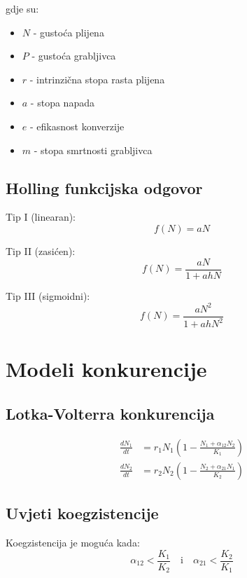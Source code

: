 \documentclass[12pt,a4paper,twoside]{book}
\begin{document}
	gdje su:
	\begin{itemize}
		\item $N$ - gustoća plijena
		\item $P$ - gustoća grabljivca
		\item $r$ - intrinzična stopa rasta plijena
		\item $a$ - stopa napada
		\item $e$ - efikasnost konverzije
		\item $m$ - stopa smrtnosti grabljivca
	\end{itemize}
	
	\subsection{Holling funkcijska odgovor}
	Tip I (linearan):
	\begin{equation}
		f(N) = aN
	\end{equation}
	
	Tip II (zasićen):
	\begin{equation}
		f(N) = \frac{aN}{1 + ahN}
	\end{equation}
	
	Tip III (sigmoidni):
	\begin{equation}
		f(N) = \frac{aN^2}{1 + ahN^2}
	\end{equation}
	
	\section{Modeli konkurencije}
	
	\subsection{Lotka-Volterra konkurencija}
	\begin{align}
		\frac{dN_1}{dt} &= r_1 N_1 \left(1 - \frac{N_1 + \alpha_{12}N_2}{K_1}\right) \\
		\frac{dN_2}{dt} &= r_2 N_2 \left(1 - \frac{N_2 + \alpha_{21}N_1}{K_2}\right)
	\end{align}
	
	\subsection{Uvjeti koegzistencije}
	Koegzistencija je moguća kada:
	\begin{equation}
		\alpha_{12} < \frac{K_1}{K_2} \quad \text{i} \quad \alpha_{21} < \frac{K_2}{K_1}
	\end{equation}
	
\end{document}
